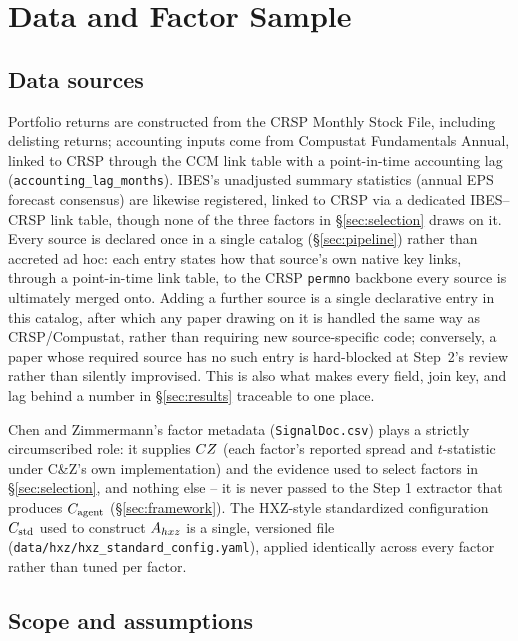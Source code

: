 \section{Data and Factor Sample}
\label{sec:data}

\subsection{Data sources}

Portfolio returns are constructed from the CRSP Monthly Stock File,
including delisting returns; accounting inputs come
from Compustat Fundamentals Annual, linked to CRSP through the CCM link
table with a point-in-time accounting lag
(\texttt{accounting\_lag\_months}). IBES's unadjusted summary
statistics (annual EPS forecast consensus) are likewise registered, linked
to CRSP via a dedicated IBES--CRSP link table, though none of the three
factors in \S\ref{sec:selection} draws on it. Every source is declared once
in a single catalog (\S\ref{sec:pipeline}) rather than accreted ad hoc: each
entry states how that source's own native key links, through a
point-in-time link table, to the CRSP \texttt{permno} backbone every source
is ultimately merged onto. Adding a further source is a single declarative
entry in this catalog, after which any paper drawing on it is handled the
same way as CRSP/Compustat, rather than requiring new source-specific code;
conversely, a paper whose required source has no such entry is hard-blocked
at Step~2's review rather than silently improvised. This is also what makes
every field, join key, and lag behind a number in \S\ref{sec:results}
traceable to one place.

Chen and Zimmermann's factor metadata (\texttt{SignalDoc.csv}) plays a
strictly circumscribed role: it supplies $CZ$ (each factor's reported
spread and $t$-statistic under C\&Z's own implementation) and the evidence
used to select factors in \S\ref{sec:selection}, and nothing else -- it is
never passed to the Step 1 extractor that produces $C_{\text{agent}}$
(\S\ref{sec:framework}). The HXZ-style standardized configuration $C_{\text{std}}$
used to construct $A_{hxz}$ is a single, versioned file
(\texttt{data/hxz/hxz\_standard\_config.yaml}), applied identically across
every factor rather than tuned per factor.

\subsection{Scope and assumptions}
\label{sec:scope}

